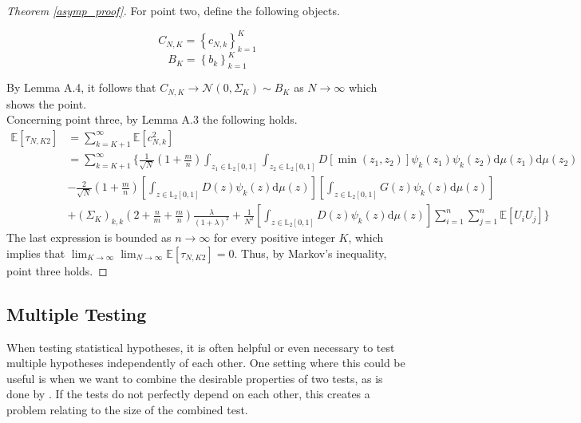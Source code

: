 \documentclass[12pt, a4paper]{article}
\theoremstyle{MAstyle} \newtheorem{assumption}{Assumption}[section]
\theoremstyle{MAstyle} \newtheorem{definition}{Definition}[section]
\theoremstyle{MAstyle} \newtheorem{theorem}{Theorem}[section]
\begin{document}
\begin{proof}[Theorem \ref{asymp_proof}]
		For point two, define the following objects.
		\begin{multicols}{2}
			\noindent
			\begin{equation*}
				C_{N,K} = \left\{c_{N,k}\right\}_{k=1}^K
			\end{equation*}
			\begin{equation}
				B_{K} = \left\{b_{k}\right\}_{k=1}^K
			\end{equation}
		\end{multicols}
		By Lemma A.4, it follows that $C_{N,K} \rightarrow \mathcal{N}(0, \Sigma_K) \sim B_K$ as $N \rightarrow \infty$ which shows the point.\\
		
		Concerning point three, by Lemma A.3 the following holds.
		\begin{equation}
			\begin{split}
				\mathbb{E}[\tau_{N,K2}] &= \sum_{k = K+1}^{\infty} \mathbb{E}[c_{N,k}^2] \\
				&= \sum_{k = K+1}^{\infty} \Bigg\{ \frac{1}{\sqrt{N}} \left(1 + \frac{m}{n}\right) \int_{z_1 \in \mathbb{L}_2[0,1]} \int_{z_2 \in \mathbb{L}_2[0,1]} D\left[\min(z_1, z_2)\right] \psi_k(z_1) \psi_k(z_2) \mathrm{d}\mu(z_1) \mathrm{d}\mu(z_2) \\
				& - \frac{2}{\sqrt{N}} \left(1 + \frac{m}{n}\right) \left[\int_{z \in \mathbb{L}_2[0,1]} D(z) \psi_k(z) \mathrm{d}\mu(z) \right] \left[\int_{z \in \mathbb{L}_2[0,1]} G(z) \psi_k(z) \mathrm{d}\mu(z) \right] \\
				& + \left(\Sigma_K\right)_{k,k} \left(2 + \frac{n}{m} + \frac{m}{n}\right) \frac{\lambda}{(1 + \lambda)^2} + \frac{1}{N^2} \left[\int_{z \in \mathbb{L}_2[0,1]} D(z) \psi_k(z) \mathrm{d}\mu(z) \right] \sum_{i = 1}^{n}\sum_{j = 1}^{n} \mathbb{E}\left[U_i U_j\right]\Bigg\}
			\end{split}
		\end{equation}
	The last expression is bounded as $n \rightarrow \infty$ for every positive integer $K$, which implies that $\lim_{K \rightarrow \infty} \lim_{N \rightarrow \infty} \mathbb{E}\left[\tau_{N,K2}\right] = 0$. Thus, by Markov's inequality, point three holds.
		\end{proof}
	
		\newpage
		\subsection{Multiple Testing}\label{Multiple_Testing}
			When testing statistical hypotheses, it is often helpful or even necessary to test multiple hypotheses independently of each other. One setting where this could be useful is when we want to combine the desirable properties of two tests, as is done by \cite{bugni_permutation_2021}. If the tests do not perfectly depend on each other, this creates a problem relating to the size of the combined test.
			
\end{document}
